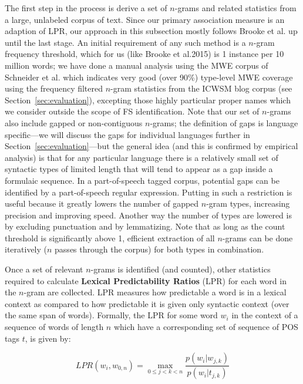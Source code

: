 \documentclass[11pt,letterpaper]{article}
\makeatletter
\def \al {al.\@ }
\newcommand{\termdef}[1]{\textbf{#1}\xspace}
\newcommand{\secref}[2][]{Section#1~\ref{#2}\xspace}
\makeatother
\begin{document}
The first step in the process is derive a set of $n$-grams and related statistics from a large, unlabeled corpus of text. Since our primary association measure is an adaption of LPR, our approach in this subsection mostly follows Brooke et \al {} up until the last stage. An initial requirement of any such method is a $n$-gram frequency threshold, which for us (like Brooke et \al 2015) is 1 instance per 10 million words; we have done a manual analysis using the MWE corpus of Schneider et \al {} which indicates very good (over 90\%) type-level MWE coverage using the frequency filtered $n$-gram statistics from the ICWSM blog corpus (see \secref{sec:evaluation}), excepting those highly particular proper names which we consider outside the scope of FS identification. Note that our set of $n$-grams also include gapped or non-contiguous $n$-grams; the definition of gaps is language specific---we will discuss the gaps for individual languages further in \secref{sec:evaluation}---but the general idea (and this is confirmed by empirical analysis) is that for any particular language there is a relatively small set of syntactic types of limited length that will tend to appear as a gap inside a formulaic sequence. In a part-of-speech tagged corpus, potential gaps can be identified by a part-of-speech regular expression. Putting in such a restriction is useful because it greatly lowers the number of gapped $n$-gram types, increasing precision and improving speed. Another way the number of types are lowered is by excluding punctuation and by lemmatizing.  Note that as long as the count threshold is significantly above 1, efficient extraction of all $n$-grams can be done iteratively ($n$ passes through the corpus) for both types in combination. 

Once a set of relevant $n$-grams is identified (and counted), other statistics required to calculate \termdef{Lexical Predictability Ratios} (LPR) for each word in the $n$-gram are collected. LPR measures how predictable a word is in a lexical context as compared to how predictable it is given only syntactic context (over the same span of words). Formally, the LPR for some word $w_i$ in the context of a sequence of words of length $n$ which have a corresponding set of sequence of POS tags $t$, is given by:

\begin{displaymath}
LPR(w_i,w_{0,n}) = \max_{0 \leq j < k < n }{\frac{p(w_i|w_{j,k})}{p(w_i|t_{j,k})}}
\end{displaymath}
\end{document}
